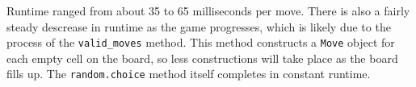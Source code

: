 \documentclass[12pt]{article}
\begin{document}
Runtime ranged from about 35 to 65 milliseconds per move. There is also a fairly steady descrease in runtime as the game progresses, which is likely due to the process of the \texttt{valid\_moves} method. This method constructs a \texttt{Move} object for each empty cell on the board, so less constructions will take place as the board fills up. The \texttt{random.choice} method itself completes in constant runtime.
\end{document}
